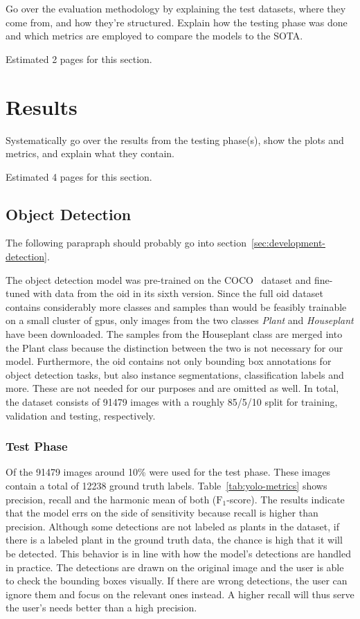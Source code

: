 \documentclass[draft,final]{vutinfth} %
\begin{document}
Go over the evaluation methodology by explaining the test datasets,
where they come from, and how they're structured. Explain how the
testing phase was done and which metrics are employed to compare the
models to the SOTA.

Estimated 2 pages for this section.

\section{Results}
\label{sec:results}

Systematically go over the results from the testing phase(s), show the
plots and metrics, and explain what they contain. 

Estimated 4 pages for this section.

\subsection{Object Detection}
\label{ssec:yolo-eval}

The following parapraph should probably go into
section~\ref{sec:development-detection}.

The object detection model was pre-trained on the COCO~\cite{lin2015}
dataset and fine-tuned with data from the \gls{oid}
\cite{kuznetsova2020} in its sixth version. Since the full \gls{oid}
dataset contains considerably more classes and samples than would be
feasibly trainable on a small cluster of \glspl{gpu}, only images from
the two classes \emph{Plant} and \emph{Houseplant} have been
downloaded. The samples from the Houseplant class are merged into the
Plant class because the distinction between the two is not necessary
for our model. Furthermore, the \gls{oid} contains not only bounding
box annotations for object detection tasks, but also instance
segmentations, classification labels and more. These are not needed
for our purposes and are omitted as well. In total, the dataset
consists of 91479 images with a roughly 85/5/10 split for training,
validation and testing, respectively.

\subsubsection{Test Phase}
\label{sssec:yolo-test}

Of the 91479 images around 10\% were used for the test phase. These
images contain a total of 12238 ground truth
labels. Table~\ref{tab:yolo-metrics} shows precision, recall and the
harmonic mean of both ($\mathrm{F}_1$-score). The results indicate
that the model errs on the side of sensitivity because recall is
higher than precision. Although some detections are not labeled as
plants in the dataset, if there is a labeled plant in the ground truth
data, the chance is high that it will be detected. This behavior is in
line with how the model's detections are handled in practice. The
detections are drawn on the original image and the user is able to
check the bounding boxes visually. If there are wrong detections, the
user can ignore them and focus on the relevant ones instead. A higher
recall will thus serve the user's needs better than a high precision.
\end{document}
